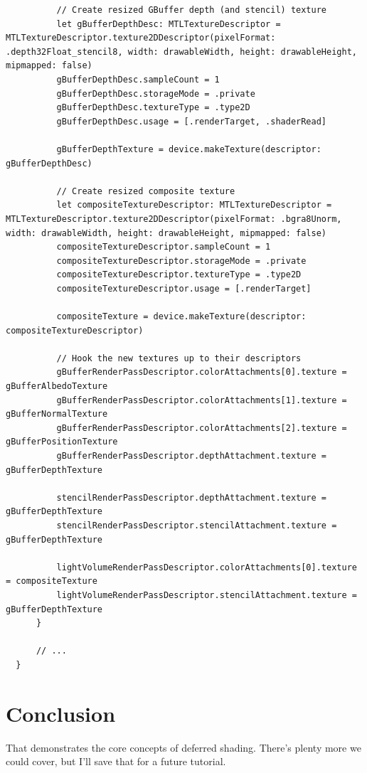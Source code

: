 \documentclass[11pt]{article}
\begin{document}
\begin{verbatim}
          // Create resized GBuffer depth (and stencil) texture
          let gBufferDepthDesc: MTLTextureDescriptor = MTLTextureDescriptor.texture2DDescriptor(pixelFormat: .depth32Float_stencil8, width: drawableWidth, height: drawableHeight, mipmapped: false)
          gBufferDepthDesc.sampleCount = 1
          gBufferDepthDesc.storageMode = .private
          gBufferDepthDesc.textureType = .type2D
          gBufferDepthDesc.usage = [.renderTarget, .shaderRead]

          gBufferDepthTexture = device.makeTexture(descriptor: gBufferDepthDesc)

          // Create resized composite texture
          let compositeTextureDescriptor: MTLTextureDescriptor = MTLTextureDescriptor.texture2DDescriptor(pixelFormat: .bgra8Unorm, width: drawableWidth, height: drawableHeight, mipmapped: false)
          compositeTextureDescriptor.sampleCount = 1
          compositeTextureDescriptor.storageMode = .private
          compositeTextureDescriptor.textureType = .type2D
          compositeTextureDescriptor.usage = [.renderTarget]

          compositeTexture = device.makeTexture(descriptor: compositeTextureDescriptor)

          // Hook the new textures up to their descriptors
          gBufferRenderPassDescriptor.colorAttachments[0].texture = gBufferAlbedoTexture
          gBufferRenderPassDescriptor.colorAttachments[1].texture = gBufferNormalTexture
          gBufferRenderPassDescriptor.colorAttachments[2].texture = gBufferPositionTexture
          gBufferRenderPassDescriptor.depthAttachment.texture = gBufferDepthTexture

          stencilRenderPassDescriptor.depthAttachment.texture = gBufferDepthTexture
          stencilRenderPassDescriptor.stencilAttachment.texture = gBufferDepthTexture

          lightVolumeRenderPassDescriptor.colorAttachments[0].texture = compositeTexture
          lightVolumeRenderPassDescriptor.stencilAttachment.texture = gBufferDepthTexture
      }

      // ...
  }
\end{verbatim}

\section*{Conclusion}
\label{sec:orgfd9fc28}

That demonstrates the core concepts of deferred shading. There's plenty more we
could cover, but I'll save that for a future tutorial.
\end{document}
